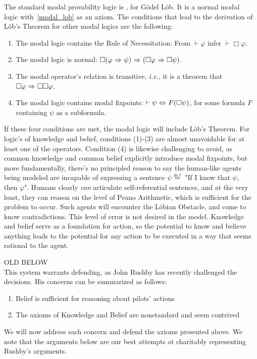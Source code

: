 The standard modal provability logic is , for G\"odel L\"ob. It is a normal modal logic with~\ref{modal_lob} as an axiom. The conditions that lead to the derivation of L\"ob's Theorem for other modal logics are the following:
\begin{enumerate}
	\item The modal logic contains the Rule of Necessitation: From $\vdash \varphi$ infer $\vdash \Box \varphi$.
	\item The modal logic is normal: $\Box(\varphi {\ \Rightarrow \ } \psi) {\ \Rightarrow \ } (\Box \varphi {\ \Rightarrow \ } \Box \psi)$.
	\item The modal operator's relation is transitive, \emph{i.e.,} it is a theorem that $\Box \varphi {\ \Rightarrow \ } \Box \Box \varphi$.
	\item The modal logic contains modal fixpoints: $\vdash \psi {\ \Leftrightarrow \ } F(\Box\psi)$, for some formula $F$ containing $\psi$ as a subformula.
\end{enumerate}
If these four conditions are met, the modal logic will include L\"ob's Theorem. For logic's of knowledge and belief, conditions (1)-(3) are almost unavoidable for at least one of the operators. Condition (4) is likewise challenging to avoid, as common knowledge and common belief explicitly introduce modal fixpoints, but more fundamentally, there's no principled reason to say the human-like agents being modeled are incapable of expressing a sentence $\psi \stackrel{def}{=}$ "If I know that $\psi$, then $\varphi$". Humans clearly \emph{can} articulate self-referential sentences, and at the very least, they can reason on the level of Peano Arithmetic, which is sufficient for the problem to occur. Such agents will encounter the L\"obian Obstacle, and come to know contradictions. This level of error is not desired in the model. Knowledge and belief serve as a foundation for action, so the potential to know and believe anything leads to the potential for any action to be executed in a way that seems rational to the agent.

OLD BELOW\\
This system warrants defending, as John Rushby has recently challenged the decisions. His concerns can be summarized as follows:
\begin{enumerate}
	\item Belief is sufficient for reasoning about pilots' actions
	\item The axioms of Knowledge and Belief are nonstandard and seem contrived
\end{enumerate}
We will now address each concern and defend the axioms presented above. We note that the arguments below are our best attempts at charitably representing Rushby's arguments.

